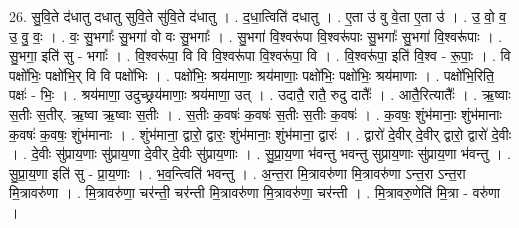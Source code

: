 \documentclass[17pt]{extarticle}
\begin{document}
26. सु॒वि॒ते द॑धातु दधातु सुवि॒ते सु॑वि॒ते द॑धातु । . द॒धा॒त्विति॑ दधातु । . ए॒ता उ॑ वु वे॒ता ए॒ता उ॑ । . उ॒ वो॒ व॒ उ॒ वु॒ वः॒ । . वः॒ सु॒भगाः᳚ सु॒भगा॑ वो वः सु॒भगाः᳚ । . सु॒भगा॑ वि॒श्वरू॑पा वि॒श्वरू॑पाः सु॒भगाः᳚ सु॒भगा॑ वि॒श्वरू॑पाः । . सु॒भगा॒ इति॑ सु - भगाः᳚ । . वि॒श्वरू॑पा॒ वि वि वि॒श्वरू॑पा वि॒श्वरू॑पा॒ वि । . वि॒श्वरू॑पा॒ इति॑ वि॒श्व - रू॒पाः॒ । . वि पक्षो॑भिः॒ पक्षो॑भि॒र् वि वि पक्षो॑भिः । . पक्षो॑भिः॒ श्रय॑माणाः॒ श्रय॑माणाः॒ पक्षो॑भिः॒ पक्षो॑भिः॒ श्रय॑माणाः । . पक्षो॑भि॒रिति॒ पक्षः॑ - भिः॒ । . श्रय॑माणा॒ उदुच्छ्रय॑माणाः॒ श्रय॑माणा॒ उत् । . उदातै॒ रातै॒ रुदु दातैः᳚ । . आतै॒रित्यातैः᳚ । . ऋ॒ष्वाः स॒तीः स॒तीर्. ऋ॒ष्वा ऋ॒ष्वाः स॒तीः । . स॒तीः क॒वषः॑ क॒वषः॑ स॒तीः स॒तीः क॒वषः॑ । . क॒वषः॒ शुंभ॑मानाः॒ शुंभ॑मानाः क॒वषः॑ क॒वषः॒ शुंभ॑मानाः । . शुंभ॑माना॒ द्वारो॒ द्वारः॒ शुंभ॑मानाः॒ शुंभ॑माना॒ द्वारः॑ । . द्वारो॑ दे॒वीर् दे॒वीर् द्वारो॒ द्वारो॑ दे॒वीः । . दे॒वीः सु॑प्राय॒णाः सु॑प्राय॒णा दे॒वीर् दे॒वीः सु॑प्राय॒णाः । . सु॒प्रा॒य॒णा भ॑वन्तु भवन्तु सुप्राय॒णाः सु॑प्राय॒णा भ॑वन्तु । . सु॒प्रा॒य॒णा इति॑ सु - प्रा॒य॒णाः । . भ॒व॒न्त्विति॑ भवन्तु । . अ॒न्त॒रा मि॒त्रावरु॑णा मि॒त्रावरु॑णा ऽन्त॒रा ऽन्त॒रा मि॒त्रावरु॑णा । . मि॒त्रावरु॑णा॒ चर॑न्ती॒ चर॑न्ती मि॒त्रावरु॑णा मि॒त्रावरु॑णा॒ चर॑न्ती । . मि॒त्रावरु॒णेति॑ मि॒त्रा - वरु॑णा । \newline
\end{document}
